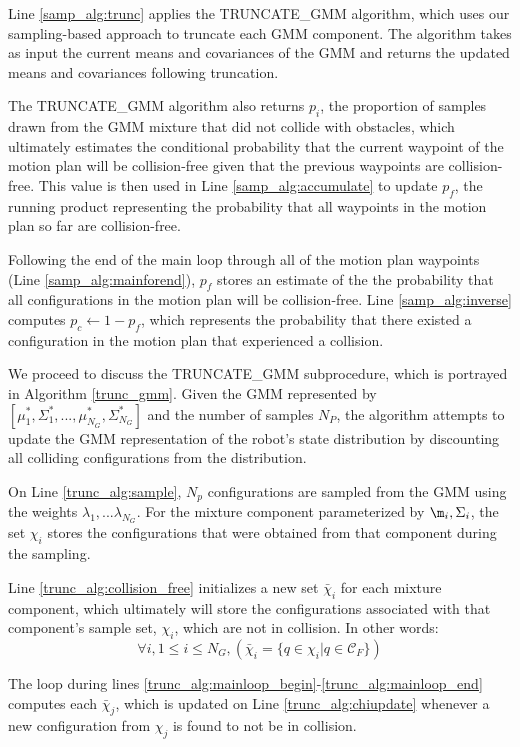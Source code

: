 \documentclass[journal]{IEEEtran}
\begin{document}
Line \ref{samp_alg:trunc} applies the TRUNCATE\_GMM algorithm, which uses our sampling-based approach to truncate each GMM component. The algorithm takes as input the current means and covariances of the GMM and returns the updated means and covariances following truncation.

The TRUNCATE\_GMM algorithm also returns $p_i$, the proportion of samples drawn from the GMM mixture that did not collide with obstacles, which ultimately estimates the conditional probability that the current waypoint of the motion plan will be collision-free given that the previous waypoints are collision-free. This value is then used in Line \ref{samp_alg:accumulate} to update $p_f$, the running product representing the probability that all waypoints in the motion plan so far are collision-free.

Following the end of the main loop through all of the motion plan waypoints (Line \ref{samp_alg:mainforend}), $p_f$ stores an estimate of the the probability that all configurations in the motion plan will be collision-free. Line \ref{samp_alg:inverse} computes $p_c \gets 1-p_f$, which represents the probability that there existed a configuration in the motion plan that experienced a collision.

We proceed to discuss the TRUNCATE\_GMM subprocedure, which is portrayed in Algorithm \ref{trunc_gmm}. Given the GMM represented by $[\mu_1^*,\Sigma_1^*,...,\mu_{N_G}^*,\Sigma_{N_G}^*]$ and the number of samples $N_P$, the algorithm attempts to update the GMM representation of the robot's state distribution by discounting all colliding configurations from the distribution.

On Line \ref{trunc_alg:sample}, $N_p$ configurations are sampled from the GMM using the weights $\lambda_1,...\lambda_{N_G}$. For the mixture component parameterized by $\m_i, \Sigma_i$, the set $\chi_i$ stores the configurations that were obtained from that component during the sampling.

Line \ref{trunc_alg:collision_free} initializes a new set $\bar{\chi}_i$ for each mixture component, which ultimately will store the configurations associated with that component's sample set, $\chi_i$, which are not in collision. In other words:
$$\forall i, 1 \leq i \leq N_{G}, ( \bar{\chi}_i  = \{q \in \chi_i | q \in \mathcal{C}_F \})$$

The loop during lines \ref{trunc_alg:mainloop_begin}-\ref{trunc_alg:mainloop_end} computes each $\bar{\chi}_j$, which is updated on Line \ref{trunc_alg:chiupdate} whenever a new configuration from $\chi_j$ is found to not be in collision.
\end{document}
